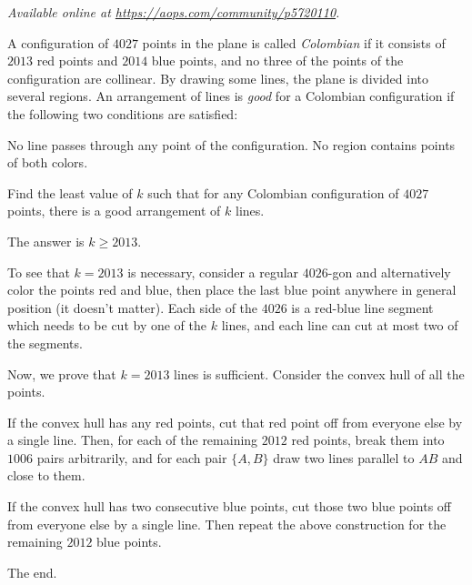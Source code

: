 \textsl{Available online at \url{https://aops.com/community/p5720110}.}
\begin{mdframed}[style=mdpurplebox,frametitle={Problem statement}]
A configuration of $4027$ points in the plane is called
\emph{Colombian} if it consists of $2013$ red points and $2014$ blue points,
and no three of the points of the configuration are collinear.
By drawing some lines, the plane is divided into several regions.
An arrangement of lines is \emph{good} for a Colombian configuration
if the following two conditions are satisfied:
\begin{enumerate}
  \ii[(i)] No line passes through any point of the configuration.
  \ii[(ii)] No region contains points of both colors.
\end{enumerate}
Find the least value of $k$ such that for any Colombian configuration
of $4027$ points, there is a good arrangement of $k$ lines.
\end{mdframed}
The answer is $k \ge 2013$.

To see that $k = 2013$ is necessary,
consider a regular $4026$-gon and alternatively color the
points red and blue,
then place the last blue point anywhere
in general position (it doesn't matter).
Each side of the $4026$ is a red-blue line segment
which needs to be cut by one of the $k$ lines,
and each line can cut at most two of the segments.

Now, we prove that $k = 2013$ lines is sufficient.
Consider the convex hull of all the points.
\begin{itemize}
  \ii If the convex hull has any red points,
  cut that red point off from everyone else by a single line.
  Then, for each of the remaining $2012$ red points,
  break them into $1006$ pairs arbitrarily,
  and for each pair $\{A, B\}$ draw two lines
  parallel to $AB$ and close to them.

  \ii If the convex hull has two consecutive blue points,
  cut those two blue points off from everyone else by a single line.
  Then repeat the above construction
  for the remaining $2012$ blue points.
\end{itemize}
The end.
\pagebreak